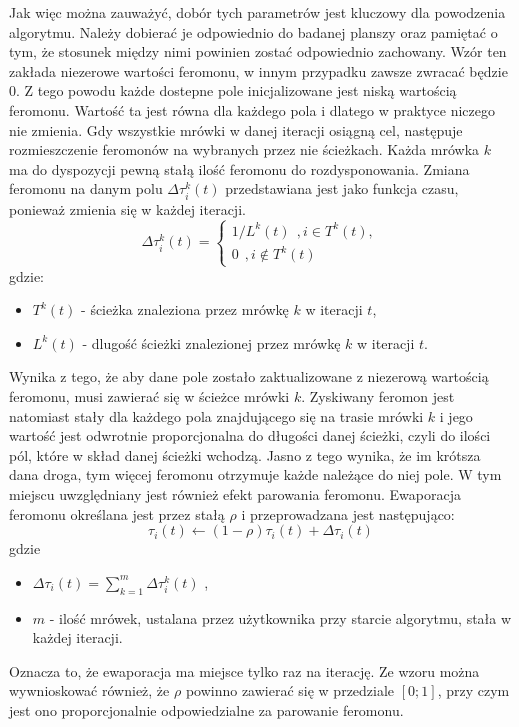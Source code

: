 \documentclass[printmode, openany, oneside, eng]{mgr}
\begin{document}
Jak więc można zauważyć, dobór tych parametrów jest kluczowy dla powodzenia algorytmu. Należy dobierać je odpowiednio do badanej planszy oraz pamiętać o tym, że stosunek między nimi powinien zostać odpowiednio zachowany.
\newline Wzór ten zakłada niezerowe wartości feromonu, w innym przypadku zawsze zwracać będzie 0. Z tego powodu każde dostepne pole inicjalizowane jest niską wartością feromonu. Wartość ta jest równa dla każdego pola i dlatego w praktyce niczego nie zmienia.
\newline
Gdy wszystkie mrówki w danej iteracji osiągną cel, następuje rozmieszczenie feromonów na wybranych przez nie ścieżkach. Każda mrówka $k$ ma do dyspozycji pewną stałą ilość feromonu do rozdysponowania. Zmiana feromonu na danym polu $\Delta \tau^k_{i}(t)$ przedstawiana jest jako funkcja czasu, ponieważ zmienia się w każdej iteracji.
\begin{equation} 
\Delta \tau^k_{i}(t) = 
\begin{cases}
1/L^k(t)  \ \  , i \in T^k(t),
\\ 0 \ \ , i \notin T^k(t)
 \end{cases}
\end{equation} 
\newline gdzie:
\begin{itemize}
\item $T^k(t)$ - ścieżka znaleziona przez mrówkę $k$ w iteracji $t$,
\item $L^k(t) $ - dlugość ścieżki znalezionej przez mrówkę $k$ w iteracji $t$.
\end{itemize}
Wynika z tego, że aby dane pole zostało zaktualizowane z niezerową wartością feromonu, musi zawierać się w ścieżce mrówki $k$. Zyskiwany feromon jest natomiast stały dla każdego pola znajdującego się na trasie mrówki $k$ i jego wartość jest odwrotnie proporcjonalna do długości danej ścieżki, czyli do ilości pól, które w skład danej ścieżki wchodzą. Jasno z tego wynika, że im krótsza dana droga, tym więcej feromonu otrzymuje każde należące do niej pole. 
\newline W tym miejscu uwzględniany jest również efekt parowania feromonu. Ewaporacja feromonu określana jest przez stałą $\rho$ i przeprowadzana jest następująco:
\newline
\begin{equation} 
\tau_{i}(t)  \leftarrow (1-\rho)\tau_{i}(t) + \Delta\tau_{i}(t)
\end{equation} 
\newline \newline \newline 
\newline gdzie
\begin{itemize}
\item  $\Delta\tau_{i}(t) =  \sum^{m}_{k=1} \Delta \tau^k_{i}(t)$ ,
\item $m$ - ilość mrówek, ustalana przez użytkownika przy starcie algorytmu, stała w każdej iteracji.
\end{itemize}
Oznacza to, że ewaporacja ma miejsce tylko raz na iterację. Ze wzoru można wywnioskować również, że $\rho$ powinno zawierać się w przedziale $[0;1]$, przy czym jest ono proporcjonalnie odpowiedzialne za parowanie feromonu.
\end{document}
